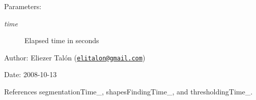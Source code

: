 \begin{Desc}
\item[Parameters:]
\begin{description}
\item[{\em time}]Elapsed time in seconds\end{description}
\end{Desc}
\begin{Desc}
\item[Author:]Eliezer Talón (\href{mailto:elitalon@gmail.com}{\tt elitalon@gmail.com}) \end{Desc}
\begin{Desc}
\item[Date:]2008-10-13 \end{Desc}


References segmentationTime\_\-, shapesFindingTime\_\-, and thresholdingTime\_\-.